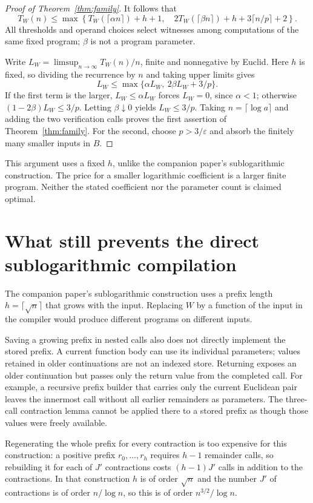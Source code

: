 \documentclass[11pt]{article}
\begin{document}
\begin{proof}[Proof of Theorem~\ref{thm:family}]
It follows that
\[
T_W(n)\leq
\max\left\{
 T_W(\lceil\alpha n\rceil)+h+1,\quad
 2T_W(\lceil\beta n\rceil)+h+3\lceil n/p\rceil+2
\right\}.
\]
All thresholds and operand choices select witnesses among computations of
the same fixed program; $\beta$ is not a program parameter.

Write $L_W=\limsup_{n\to\infty}T_W(n)/n$, finite and nonnegative by Euclid.
Here $h$ is fixed, so dividing the recurrence by $n$ and taking upper limits
gives
\[
L_W\leq\max\{\alpha L_W,\ 2\beta L_W+3/p\}.
\]
If the first term is the larger, $L_W\leq\alpha L_W$ forces $L_W=0$, since
$\alpha<1$; otherwise $(1-2\beta)L_W\leq3/p$.
Letting $\beta\downarrow0$ yields $L_W\leq3/p$.
Taking $n=\lceil\log a\rceil$ and adding the two verification calls proves
the first assertion of Theorem~\ref{thm:family}. For the second, choose
$p>3/\varepsilon$ and absorb the finitely many smaller inputs in $B$.
\end{proof}

This argument uses a fixed $h$, unlike the companion paper's sublogarithmic
construction. The price for a smaller logarithmic coefficient is a larger
finite program. Neither the stated coefficient nor the parameter count is
claimed optimal.

\section{What still prevents the direct sublogarithmic compilation}

The companion paper's sublogarithmic construction uses a prefix length
$h=\lceil\sqrt n\rceil$ that grows with the input.
Replacing $W$ by a function of the input in the compiler would produce
different programs on different inputs.

Saving a growing prefix in nested calls also does not directly implement the
stored prefix. A current function body can use its individual parameters;
values retained in older continuations are not an indexed store. Returning
exposes an older continuation but passes only the return value from the
completed call. For example, a recursive prefix builder that carries only the
current Euclidean pair leaves the innermost call without all earlier
remainders as parameters. The three-call contraction lemma cannot be applied
there to a stored prefix as though those values were freely available.

Regenerating the whole prefix for every contraction is too expensive for
this construction: a positive prefix $r_0,\ldots,r_h$ requires $h-1$
remainder calls, so rebuilding it for each of $J'$ contractions costs
$(h-1)J'$ calls in addition to the contractions. In that construction $h$ is
of order $\sqrt n$ and the number $J'$ of contractions is of order
$n/\log n$, so this is of order $n^{3/2}/\log n$.
\end{document}
